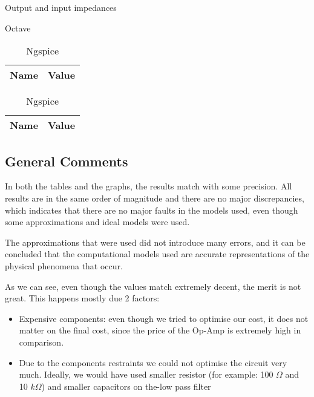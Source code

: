 \begin{table}[H]
    \caption{Output and input impedances}
    \begin{subtable}{.5\linewidth}
      \centering
        \caption{Octave}
        \begin{tabular}{ll}
        \hline    
        {\bf Name} & {\bf Value} \\ \hline
        
        \end{tabular}
        \label{tab:IMPOc}
    \end{subtable}%
    \begin{subtable}{.5\linewidth}
      \centering
        \caption{Ngspice}
        \begin{tabular}{ll}
        \hline    
        {\bf Name} & {\bf Value} \\ \hline
  	  
  	  
        \end{tabular}
        \label{tab:IMPNG}
    \end{subtable} 
    \label{tab:Impedances}
\end{table}
\indent

\subsection{General Comments}

\indent


In both the tables and the graphs, the results match with some precision. All results are in the same order of magnitude and there are no major discrepancies, which indicates that there are no major faults in the models used, even though some approximations and ideal models were used.

The approximations that were used did not introduce many errors, and it can be concluded that the computational models used are accurate representations of the physical phenomena that occur.


As we can see, even though the values match extremely decent, the merit is not great. This happens mostly due 2 factors:
\begin{itemize}
    \item Expensive components: even though we tried to optimise our cost, it does not matter on the final cost, since the price of the Op-Amp is extremely high in comparison. 
    \item Due to the components restraints we could not optimise the circuit very much. Ideally, we would have used smaller resistor (for example: 100 $\Omega$ and 10 $k\Omega$) and smaller capacitors on the-low pass filter
\end{itemize}
